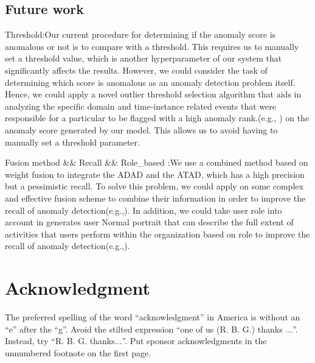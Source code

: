 \documentclass[conference]{IEEEtran}
\begin{document}
\subsection{Future work} 
Threshold:Our current procedure for determining if the anomaly score is anomalous or not is to compare with a threshold. This requires us to manually set a threshold value, which is another hyperparameter of our system that significantly affects the results. However, we could consider the task of determining which score is anomalous as an anomaly detection problem itself. Hence, we could apply a novel outlier threshold selection algorithm that aids in analyzing the specific domain and time-instance related events that were responsible for a particular to be flagged with a high anomaly rank.(e.g., \cite{b49}) on the anomaly score generated by our model. This allows us to avoid having to manually set a threshold parameter.

Fusion method \&\& Recall \&\& Role\_based	:We use a combined method based on weight fusion to integrate the ADAD and the ATAD, which has a high precision but a pessimistic recall. To solve this problem, we could apply on some complex and effective fusion scheme to combine their information in order to improve the recall of anomaly detection(e.g.,\cite{b49}).  In addition, we could take user role into account in generates user Normal portrait that can describe the full extent of activities that users perform within the organization based on role to improve the recall of anomaly detection(e.g.,\cite{b50}).   	
\fi

\section*{Acknowledgment}

The preferred spelling of the word ``acknowledgment'' in America is without 
an ``e'' after the ``g''. Avoid the stilted expression ``one of us (R. B. 
G.) thanks $\ldots$''. Instead, try ``R. B. G. thanks$\ldots$''. Put sponsor 
acknowledgments in the unnumbered footnote on the first page.
\end{document}
